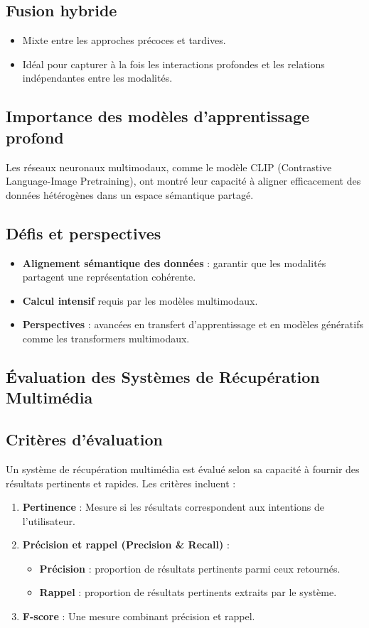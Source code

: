 \begin{section}
\subsection{Fusion hybride}
\begin{itemize}
    \item Mixte entre les approches précoces et tardives.
    \item Idéal pour capturer à la fois les interactions profondes et les relations indépendantes entre les modalités.
\end{itemize}

\section{Importance des modèles d’apprentissage profond}
Les réseaux neuronaux multimodaux, comme le modèle CLIP (Contrastive Language-Image Pretraining), ont montré leur capacité à aligner efficacement des données hétérogènes dans un espace sémantique partagé.

\section{Défis et perspectives}
\begin{itemize}
    \item \textbf{Alignement sémantique des données} : garantir que les modalités partagent une représentation cohérente.
    \item \textbf{Calcul intensif} requis par les modèles multimodaux.
    \item \textbf{Perspectives} : avancées en transfert d’apprentissage et en modèles génératifs comme les transformers multimodaux.
\end{itemize}

\section{Évaluation des Systèmes de Récupération Multimédia}
\subsection{Critères d’évaluation}
Un système de récupération multimédia est évalué selon sa capacité à fournir des résultats pertinents et rapides. Les critères incluent :
\begin{enumerate}
    \item \textbf{Pertinence} : Mesure si les résultats correspondent aux intentions de l’utilisateur.
    \item \textbf{Précision et rappel (Precision \& Recall)} :
    \begin{itemize}
        \item \textbf{Précision} : proportion de résultats pertinents parmi ceux retournés.
        \item \textbf{Rappel} : proportion de résultats pertinents extraits par le système.
    \end{itemize}
    \item \textbf{F-score} : Une mesure combinant précision et rappel.
\end{enumerate}


\end{section}
